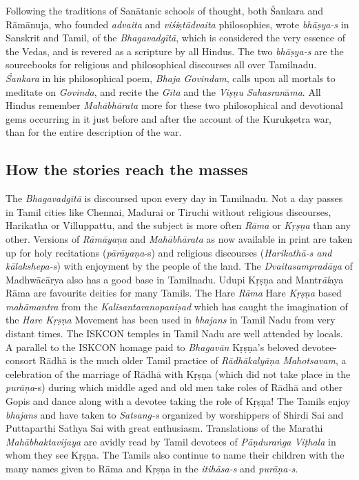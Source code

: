 \item Following the traditions of Sanātanic schools of thought, both Śankara and Rāmānuja, who founded \textit{advaita} and \textit{viśi}ṣ\textit{tādvaita} philosophies, wrote \textit{bhāṣya-s} in Sanskrit and Tamil, of the \textit{Bhagavadgītā}, which is considered the very essence of the Vedas, and is revered as a scripture by all Hindus. The two \textit{bhāṣya-s} are the sourcebooks for religious and philosophical discourses all over Tamilnadu. \textit{Śankara} in his philosophical poem, \textit{Bhaja Govindam}, calls upon all mortals to meditate on \textit{Govinda}, and recite the \textit{Gīta} and the \textit{Viṣṇu Sahasran}ā\textit{ma}. All Hindus remember \textit{Mahābhārata} more for these two philosophical and devotional gems occurring in it just before and after the account of the Kurukṣetra war, than for the entire description of the war.



\subsection{How the stories reach the masses}

\item The \textit{Bhagavadgītā} is discoursed upon every day in Tamilnadu. Not a day passes in Tamil cities like Chennai, Madurai or Tiruchi without religious discourses, Harikatha or Villuppattu, and the subject is more often \textit{Rāma} or \textit{Kṛṣṇa} than any other. Versions of \textit{Rāmāyaṇa} and \textit{Mahābhārata} as now available in print are taken up for holy recitations (\textit{pārāyaṇa}-s) and religious discourses (\textit{Harikathā-s and kālakshepa-s}) with enjoyment by the people of the land. The \textit{Dvaitasampradāya} of Madhwācārya also has a good base in Tamilnadu. Udupi Kṛṣṇa and Mantr\textit{āl}aya Rāma are favourite deities for many Tamils. The Hare \textit{Rāma} Hare \textit{Kṛṣṇa} based \textit{mahāmantra} from the \textit{Kalisantaranopaniṣad} which has caught the imagination of the \textit{Hare Kṛṣṇa} Movement has been used in \textit{bhajans} in Tamil Nadu from very distant times. The ISKCON temples in Tamil Nadu are well attended by locals. A parallel to the ISKCON homage paid to \textit{Bhagavān} Kṛṣṇa’s beloved devotee-consort Rādhā is the much older Tamil practice of \textit{Rādhākalyāṇa Mahotsavam}, a celebration of the marriage of Rādhā with Kṛṣṇa (which did not take place in the \textit{purāņa}-s) during which middle aged and old men take roles of Rādhā and other Gopis and dance along with a devotee taking the role of Kṛṣṇa! The Tamils enjoy \textit{bhajans} and have taken to \textit{Satsang-s} organized by worshippers of Shirdi Sai and Puttaparthi Sathya Sai with great enthusiasm. Translations of the Marathi \textit{Mahābhaktavijaya} are avidly read by Tamil devotees of \textit{Pāṇduraṅga Viṭhala} in whom they see Kṛṣṇa. The Tamils also continue to name their children with the many names given to Rāma and Kṛṣṇa in the \textit{itihāsa-s} and \textit{purāṇa-s.}



